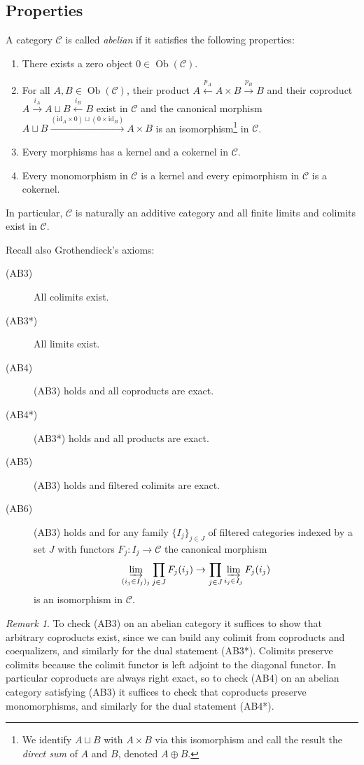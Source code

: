 \documentclass[11pt,A4]{article}
\theoremstyle{plain}
\theoremstyle{definition}
\theoremstyle{remark}
\newtheorem{rem}[thm]{Remark}
\newcommand{\1}{\mathbbm{1}}
\newcommand{\C}{\mathscr{C}}
\DeclareMathOperator{\Ob}{Ob}
\newcommand{\op}{\oplus}
\newcommand{\id}{\mathrm{id}}
\begin{document}
\subsection{Properties}

A category $\C$ is called \textit{abelian} if it satisfies the following properties:
\begin{enumerate}[label=\roman*)]
    \item There exists a zero object $0\in \Ob(\C)$.
    \item For all $A,B\in \Ob(\C)$, their product $A\xleftarrow{p_{A}} A\times B\xrightarrow{p_{B}} B$ and their coproduct $A\xrightarrow{i_{A}}A\sqcup B\xleftarrow{i_{B}} B$ exist in $\C$ and the canonical morphism $A\sqcup B\xrightarrow{(\id_{A}\times 0) \sqcup (0\times \id_{B})} A\times B$ is an isomorphism\footnote{We identify $A\sqcup B$ with $A\times B$ via this isomorphism and call the result the \textit{direct sum} of $A$ and $B$, denoted $A\op B$.} in $\C$.
    \item Every morphisms has a kernel and a cokernel in $\C$.
    \item Every monomorphism in $\C$ is a kernel and every epimorphism in $\C$ is a cokernel.
\end{enumerate}

In particular, $\C$ is naturally an additive category and all finite limits and colimits exist in $\C$.

Recall also Grothendieck's axioms:
\begin{description}
    \item[(AB3)] All colimits exist.
    \item[(AB3*)] All limits exist.
    \item[(AB4)] (AB3) holds and all coproducts are exact.
    \item[(AB4*)] (AB3*) holds and all products are exact.
    \item[(AB5)] (AB3) holds and filtered colimits are exact.
    \item[(AB6)] (AB3) holds and for any family $\{ I_{j}\}_{j\in J}$ of filtered categories indexed by a set $J$ with functors $F_{j}\colon I_{j}\to \C$ the canonical morphism
	\[ \varinjlim_{(i_{j}\in I_{j})_{j}} \prod_{j\in J}F_{j}(i_{j})\to \prod_{j\in J}\varinjlim_{i_{j}\in I_{j}} F_{j}(i_{j}) \]
	is an isomorphism in $\C$.
\end{description}

\begin{rem}
    To check (AB3) on an abelian category it suffices to show that arbitrary coproducts exist, since we can build any colimit from coproducts and coequalizers, and similarly for the dual statement (AB3*).
    Colimits preserve colimits because the colimit functor is left adjoint to the diagonal functor.
    In particular coproducts are always right exact, so to check (AB4) on an abelian category satisfying (AB3) it suffices to check that coproducts preserve monomorphisms, and similarly for the dual statement (AB4*).
\end{rem}
\end{document}
